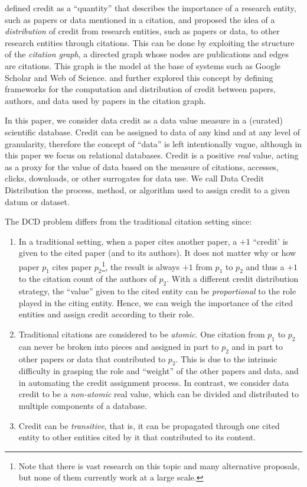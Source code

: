 \cite{katz2020SoftwareandData}  defined credit as a ``quantity'' that describes the importance of a research entity, such as papers or data mentioned in a citation, and proposed the idea of a \emph{distribution} of credit from research entities, such as papers or data, to other research entities through citations. 
This can be done by exploiting the structure of the \emph{citation graph}, a directed graph whose nodes are publications and edges are citations.
This graph is the model at the base of systems such as Google Scholar and Web of Science.
\cite{zeng2020assigning} and \cite{creditFang18} further explored this concept by defining frameworks for the  computation and distribution of credit between papers, authors, and data used by papers in the citation graph. 

In this paper, we consider data credit as a data value measure in a (curated) scientific database. Credit can be assigned to data of any kind and at any level of granularity, therefore the concept of ``data'' is left intentionally vague, although in this paper we focus on relational databases.
Credit is a positive \emph{real} value, acting as a proxy for the value of data based on the measure of citations, accesses, clicks, downloads, or other surrogates for data use. We call Data Credit Distribution the process, method, or algorithm used to assign credit to a given datum or dataset.

The DCD problem differs from the traditional citation setting since:
\begin{enumerate}
    \item In a traditional setting, when a paper cites another paper, a $+1$ ``credit' is given to the cited paper (and to its authors). It does not matter why or how paper $p_1$ cites paper $p_2$\footnote{Note that there is vast research on this topic and many alternative proposals, but none of them currently work at a large scale.}, the result is always $+1$ from $p_1$ to $p_2$ and thus a $+1$ to the citation count of the authors of $p_2$. With a different credit distribution strategy, the ``value'' given to the cited entity can be \emph{proportional} to the role played in the citing entity. Hence, we can weigh the importance of the cited entities and assign credit according to their role.
    \item Traditional citations are considered to be  \emph{atomic}. One citation from $p_1$ to $p_2$ can never be broken into pieces and assigned in part to $p_2$ and in part to other papers or data that contributed to $p_2$. This is due to the intrinsic difficulty in grasping the role and ``weight'' of the other papers and data, and in automating the credit assignment process.
	In contrast, we consider data credit to be a \emph{non-atomic} real value, which can be divided and distributed to multiple components of a database. 
	\item Credit can be \emph{transitive}, that is, it can be propagated through one cited entity to other entities cited by it that contributed to its content.
\end{enumerate}

